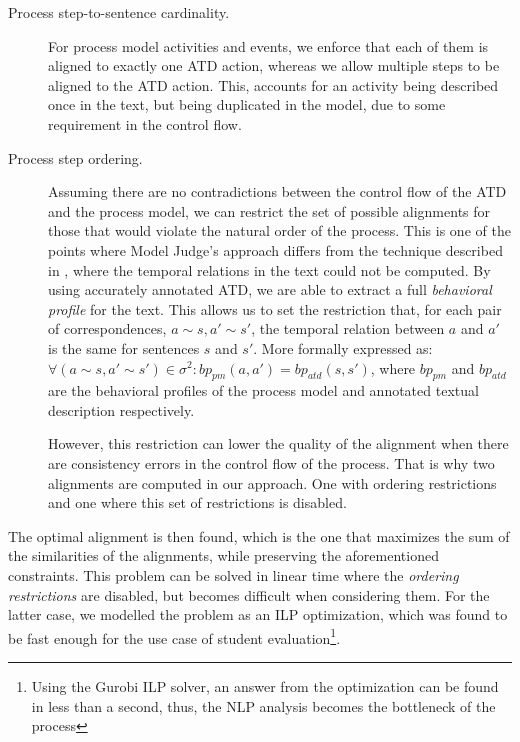 \begin{description}
\item[Process step-to-sentence cardinality.]{
    For process model activities and events, we enforce that each of them is
    aligned to exactly one ATD action, whereas we allow multiple steps to be aligned
    to the ATD action. This, accounts for an activity being described once in
    the text, but being duplicated in the model, due to some requirement in the
    control flow.}
\item[Process step ordering.]{Assuming there are no contradictions between the
    control flow of the ATD and the process model, we can restrict the set of
    possible alignments for those that would violate the natural order of the
    process. This is one of the points where Model Judge's approach
    differs from the technique described in \cite[Section
    5.6]{10.1007/978-3-319-59536-8_26}, where the temporal relations in the text
    could not be computed. By using accurately annotated ATD, we are able to
    extract a full \emph{behavioral profile} for the text. This allows us to set
    the restriction that, for each pair of correspondences, $a \sim s, a' \sim
    s'$, the temporal relation between $a$ and $a'$ is the same for sentences
    $s$ and $s'$. More formally expressed as: $\forall (a \sim s, a' \sim s')
    \in \sigma^2 : bp_{pm}(a, a') = bp_{atd}(s, s')$, where $bp_{pm}$ and
    $bp_{atd}$ are the behavioral profiles of the process model and annotated
    textual description respectively.
    
    However, this restriction can lower the quality of the alignment when there
    are consistency errors in the control flow of the process. That is why two
    alignments are computed in our approach. One with ordering restrictions and
    one where this set of restrictions is disabled.}
\end{description}

The optimal alignment is then found, which is the one that maximizes the sum of
the similarities of the alignments, while preserving the aforementioned
constraints. This problem can be solved in linear time where the \emph{ordering
  restrictions} are disabled, but becomes difficult when considering them. For
the latter case, we modelled the problem as an ILP optimization, which was found
to be fast enough for the use case of student evaluation\footnote{Using the
  Gurobi \cite{gurobi} ILP solver, an answer from the optimization can be found
  in less than a second, thus, the NLP analysis becomes the bottleneck of the
  process}.

